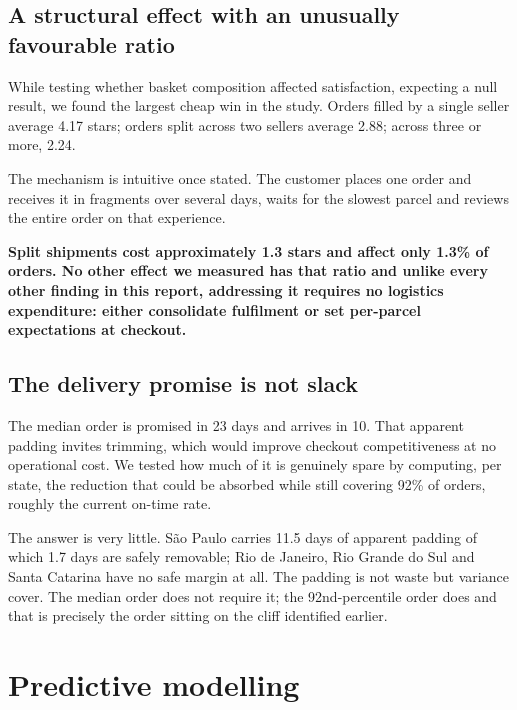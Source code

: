 \documentclass[11pt,a4paper]{article}
\newcommand{\finding}[1]{%
  \par\vspace{0.6em}%
  \noindent\begin{minipage}{\textwidth}%
  \setlength{\fboxsep}{9pt}%
  \noindent\colorbox{wash}{\begin{minipage}{\dimexpr\textwidth-2\fboxsep\relax}%
  \color{ink}\textbf{#1}%
  \end{minipage}}%
  \end{minipage}\par\vspace{0.6em}%
}
\begin{document}
\subsection{A structural effect with an unusually favourable ratio}

While testing whether basket composition affected satisfaction, expecting a null
result, we found the largest cheap win in the study. Orders filled by a single
seller average 4.17 stars; orders split across two sellers average 2.88; across
three or more, 2.24.

The mechanism is intuitive once stated. The customer places one order and receives
it in fragments over several days, waits for the slowest parcel and reviews the
entire order on that experience.

\finding{Split shipments cost approximately 1.3 stars and affect only 1.3\% of
orders. No other effect we measured has that ratio and unlike every other finding
in this report, addressing it requires no logistics expenditure: either consolidate
fulfilment or set per-parcel expectations at checkout.}

\subsection{The delivery promise is not slack}

The median order is promised in 23 days and arrives in 10. That apparent padding
invites trimming, which would improve checkout competitiveness at no operational
cost. We tested how much of it is genuinely spare by computing, per state, the
reduction that could be absorbed while still covering 92\% of orders, roughly the
current on-time rate.

The answer is very little. S\~{a}o Paulo carries 11.5 days of apparent padding of
which 1.7 days are safely removable; Rio de Janeiro, Rio Grande do Sul and Santa
Catarina have no safe margin at all. The padding is not waste but variance cover.
The median order does not require it; the 92nd-percentile order does and that is
precisely the order sitting on the cliff identified earlier.

\section{Predictive modelling}
\end{document}
